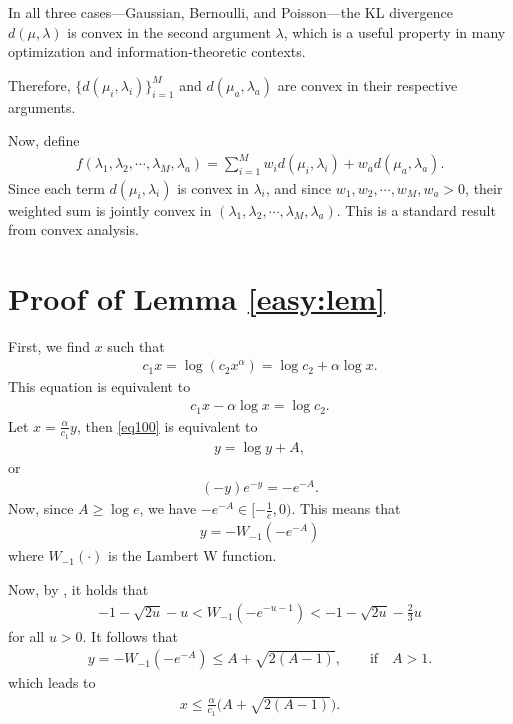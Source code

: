 \documentclass[final]{IEEEtran}
\begin{document}
In all three cases—Gaussian, Bernoulli, and Poisson—the KL divergence $d(\mu, \lambda)$ is convex in the second argument $\lambda$, which is a useful property in many optimization and information-theoretic contexts.

Therefore, $\{d(\mu_i,\lambda_i)\}_{i=1}^M$ and $d(\mu_a,\lambda_a)$ are convex in their respective arguments. 

Now, define
\begin{align}
f(\lambda_1,\lambda_2,\cdots, \lambda_M, \lambda_a)=\sum_{i=1}^M w_i d(\mu_i,\lambda_i)+ w_a d(\mu_a,\lambda_a).
\end{align}
Since each term $d(\mu_i,\lambda_i)$  is convex in $\lambda_i$, and since $w_1, w_2,\cdots,w_M, w_a>0$, their weighted sum is jointly convex in $(\lambda_1,\lambda_2,\cdots, \lambda_M, \lambda_a)$. This is a standard result from convex analysis. 
\section{Proof of Lemma \ref{easy:lem}}
First, we find $x$ such that
\begin{align}
c_1 x= \log (c_2 x^{\alpha})=\log c_2 + \alpha \log x. 
\end{align}
This equation is equivalent to
\begin{align}
c_1 x- \alpha \log x = \log c_2 \label{eq100}.
\end{align}
Let $x=\frac{\alpha}{c_1} y$, then \eqref{eq100} is equivalent to
\begin{align}
y=\log y+ A,
\end{align}
or
\begin{align}
(-y) e^{-y}=-e^{-A}.
\end{align}
Now, since $A\geq \log e$, we have $- e^{-A}\in [-\frac{1}{e},0)$. This means that
\begin{align}
y=-W_{-1}(-e^{-A})
\end{align} where $W_{-1}(\cdot)$ is the Lambert W function. 

Now, by \cite{Chatzigeorgiou2013BoundsOT}, it holds that
\begin{align}
-1-\sqrt{2u}-u<W_{-1}(-e^{-u-1})<-1-\sqrt{2u}-\frac{2}{3}u 
\end{align} for all $u>0$. It follows that
\begin{align}
y=-W_{-1}(-e^{-A}) \leq A+\sqrt{2(A-1)}, \qquad \text{if}\quad  A>1. 
\end{align} which leads to
\begin{align}
x\leq \frac{\alpha}{c_1}\big(A+\sqrt{2(A-1)}\big). 
\end{align}
\end{document}

